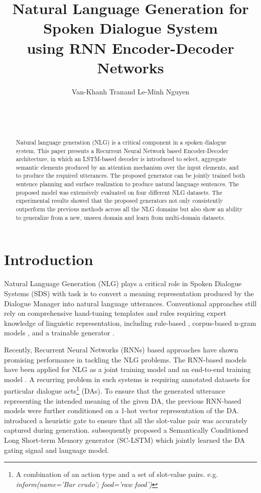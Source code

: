 \documentclass[11pt,a4paper]{article}
\title{Natural Language Generation for Spoken Dialogue System \\using RNN Encoder-Decoder Networks}
\author{%
Van-Khanh Tran\affmark[1,2] and Le-Minh Nguyen\affmark[1]\\
\affaddr{\affmark[1]Japan Advanced Institute of Science and Technology, JAIST\\
					1-1 Asahidai, Nomi, Ishikawa, 923-1292, Japan}\\
\email{\{tvkhanh, nguyenml\}@jaist.ac.jp}\\
\affaddr{\affmark[2]University of Information and Communication Technology, ICTU\\
	Thai Nguyen University, Vietnam}\\
\email{tvkhanh@ictu.edu.vn}
%
}
\begin{document}
\date{}
\maketitle

\begin{abstract}
Natural language generation (NLG) is a critical component in a spoken dialogue system. 
This paper presents a Recurrent Neural Network based Encoder-Decoder architecture, in which an LSTM-based decoder is introduced to select, aggregate semantic elements produced by an attention mechanism over the input elements, and to produce the required utterances.
The proposed generator can be jointly trained both sentence planning and surface realization to produce natural language sentences.
The proposed model was extensively evaluated on four different NLG datasets.
The experimental results showed that the proposed generators not only consistently outperform the previous methods across all the NLG domains but also show an ability to generalize from a new, unseen domain and learn from multi-domain datasets. 
\end{abstract}

\section{Introduction}\label{sec:introduction}
Natural Language Generation (NLG) plays a critical role in Spoken Dialogue Systems (SDS) with task is to convert a meaning representation produced by the Dialogue Manager into natural language utterances. Conventional approaches still rely on comprehensive hand-tuning templates and rules requiring expert knowledge of linguistic representation, including rule-based \cite{mirkovic2011dialogue}, corpus-based n-gram models \cite{oh2000stochastic}, and a trainable generator \cite{stent2004trainable}.

Recently, Recurrent Neural Networks (RNNs) based approaches have shown promising performance in tackling the NLG problems. The RNN-based models have been applied for NLG as a joint training model \cite{thwsjy15,wensclstm15} and an end-to-end training model \cite{wen2016network}. A recurring problem in such systems is requiring annotated datasets for particular dialogue acts\footnote{A combination of an action type and a set of slot-value pairs. e.g. \textit{inform(name='Bar crudo'; food='raw food')}} (DAs). To ensure that the generated utterance representing the intended meaning of the given DA, the previous RNN-based models were further conditioned on a 1-hot vector representation of the DA. \citet{thwsjy15} introduced a heuristic gate to ensure that all the slot-value pair was accurately captured during generation. \citet{wensclstm15} subsequently proposed a Semantically Conditioned Long Short-term Memory generator (SC-LSTM) which jointly learned the DA gating signal and language model.
\end{document}
